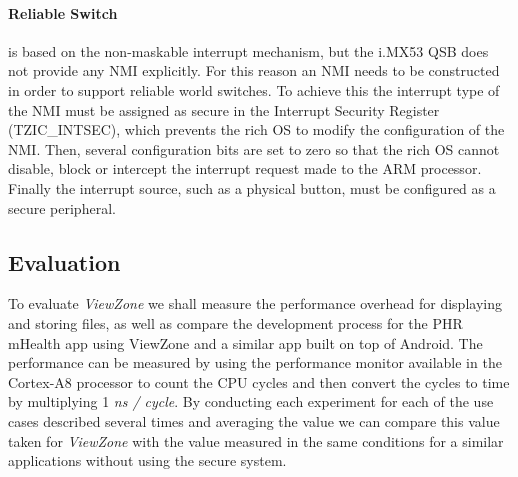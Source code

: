\paragraph{Reliable Switch} is based on the non-maskable interrupt mechanism, but the i.MX53 QSB does not provide any \ac{NMI} explicitly. For this reason an \ac{NMI} needs to be constructed in order to support reliable world switches. To achieve this the interrupt type of the \ac{NMI} must be assigned as secure in the Interrupt Security Register (TZIC\_INTSEC), which prevents the rich OS to modify the configuration of the \ac{NMI}.
Then, several configuration bits are set to zero so that the rich OS cannot disable, block or intercept the interrupt request made to the ARM processor. Finally the interrupt source, such as a physical button, must be configured as a secure peripheral.


\subsection{Evaluation}


To evaluate \emph{ViewZone} we shall measure the performance overhead for displaying and storing files, as well as compare the development process for the PHR mHealth app using ViewZone and a similar app built on top of Android. The performance can be measured by using the performance monitor available in the Cortex-A8 processor to count the CPU cycles and then convert the cycles to time by multiplying 1 \emph{ns / cycle}. By conducting each experiment for each of the use cases described several times and averaging the value we can compare this value taken for \emph{ViewZone} with the value measured in the same conditions for a similar applications without using the secure system.

